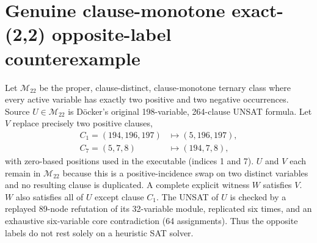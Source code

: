 \documentclass[11pt]{article}
\begin{document}
\section{Genuine clause-monotone exact-(2,2) opposite-label counterexample}
Let $\mathcal M_{22}$ be the proper, clause-distinct, clause-monotone
ternary class where every active variable has exactly two positive
and two negative occurrences. Source $U\in\mathcal M_{22}$ is
D\"ocker's original 198-variable, 264-clause UNSAT formula.
Let $V$ replace precisely two positive clauses,
\[
\begin{aligned}
 C_1=(194,196,197)&\longmapsto(5,196,197),\\
 C_7=(5,7,8)&\longmapsto(194,7,8),
\end{aligned}
\]
with zero-based positions used in the executable (indices 1 and 7).
$U$ and $V$ each remain in $\mathcal M_{22}$ because this is a
positive-incidence swap on two distinct variables and no resulting
clause is duplicated. A complete explicit witness $W$ satisfies $V$.
$W$ also satisfies all of $U$ except clause $C_1$. The UNSAT of $U$
is checked by a replayed 89-node refutation of its 32-variable
module, replicated six times, and an exhaustive six-variable core
contradiction (64 assignments). Thus the opposite labels do not rest
solely on a heuristic SAT solver.
\end{document}
